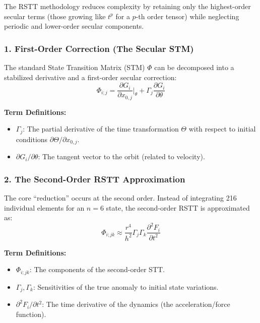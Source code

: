\documentclass[
  letterpaper,
  DIV=11,
  numbers=noendperiod,
  oneside]{scrartcl}
\begin{document}
The RSTT methodology reduces complexity by retaining only the
highest-order secular terms (those growing like \(t^p\) for a \(p\)-th
order tensor) while neglecting periodic and lower-order secular
components.

\subsubsection{1. First-Order Correction (The Secular
STM)}\label{first-order-correction-the-secular-stm}

The standard State Transition Matrix (STM) \(\Phi\) can be decomposed
into a stabilized derivative and a first-order secular correction: \[
\Phi_{i;j} = \frac{\partial G_i}{\partial x_{0,j}} \bigg|_\theta + \Gamma_j \frac{\partial G_i}{\partial \theta}
\]

\textbf{Term Definitions:}

\begin{itemize}
\item
  \(\Gamma_j\): The partial derivative of the time transformation
  \(\Theta\) with respect to initial conditions
  \(\partial \Theta / \partial x_{0,j}\).
\item
  \(\partial G_i / \partial \theta\): The tangent vector to the orbit
  (related to velocity).
\end{itemize}

\subsubsection{2. The Second-Order RSTT
Approximation}\label{the-second-order-rstt-approximation}

The core ``reduction'' occurs at the second order. Instead of
integrating 216 individual elements for an \(n=6\) state, the
second-order RSTT is approximated as:
\[\Phi_{i;jk} \approx \frac{r^4}{h^2} \Gamma_j \Gamma_k \frac{\partial^2 F_i}{\partial t^2}
\]

\textbf{Term Definitions:}

\begin{itemize}
\item
  \(\Phi_{i;jk}\): The components of the second-order STT.
\item
  \(\Gamma_j, \Gamma_k\): Sensitivities of the true anomaly to initial
  state variations.
\item
  \(\partial^2 F_i / \partial t^2\): The time derivative of the dynamics
  (the acceleration/force function).
\end{itemize}
\end{document}

